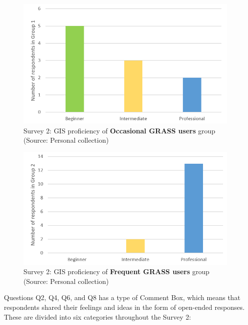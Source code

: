\documentclass[a4paper,10pt,twoside]{article}
\begin{document}
\vspace{0.3cm}
\begin{figure}[hbt!] 
\begin{center}
\includegraphics[width=11cm]{../surveys/analyzed_data/survey2_respondents_group1.png} 
\caption[Survey 2: GIS proficiency of \textbf{Occasional GRASS users} group]{Survey 2: GIS proficiency of \textbf{Occasional GRASS users} group (Source: Personal collection)}
\label{fig:survey2_respondents_group1}
\end{center}
\end{figure}

\begin{figure}[hbt!] 
\begin{center}
\includegraphics[width=11cm]{../surveys/analyzed_data/survey2_respondents_group2.png} 
\caption[Survey 2: GIS proficiency of \textbf{Frequent GRASS users} group]{Survey 2: GIS proficiency of \textbf{Frequent GRASS users} group (Source: Personal collection)}
\label{fig:survey2_respondents_group2}
\end{center}
\end{figure}


\noindent Questions Q2, Q4, Q6, and Q8 has a type of Comment Box, which means that respondents shared their feelings and ideas in the form of open-ended responses. These are divided into six categories throughout the Survey 2:
\end{document}
